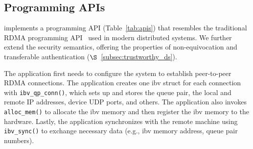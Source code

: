 \subsection{Programming APIs}
\label{sec:net-lib}
\projecttitle{} implements a programming API (Table~\ref{tab:apis}) that resembles the traditional RDMA programming API~\cite{erpc} used in modern distributed systems\cite{f04eb9b864204bab958e72055062748c, farm, hermes, rdma-design, rdma-scale, octopus, Mitchell2013}. We further extend the security semantics, offering the properties of non-equivocation and transferable authentication  ($\S$~\ref{subsec:trustworthy_ds}). %

The \projecttitle{} application first needs to configure the \projecttitle{} system to establish peer-to-peer RDMA connections. %
The application creates one ibv struct for each connection with {\tt ibv\_qp\_conn()}, which sets up and stores the queue pair, the local and remote IP addresses, device UDP ports, and others. 
The application also invokes {\tt alloc\_mem()} to allocate the ibv memory and then register the ibv memory to the \projecttitle{} hardware. 
Lastly, the application synchronizes with the remote machine using {\tt ibv\_sync()} to exchange necessary data (e.g., ibv memory address, queue pair numbers).

